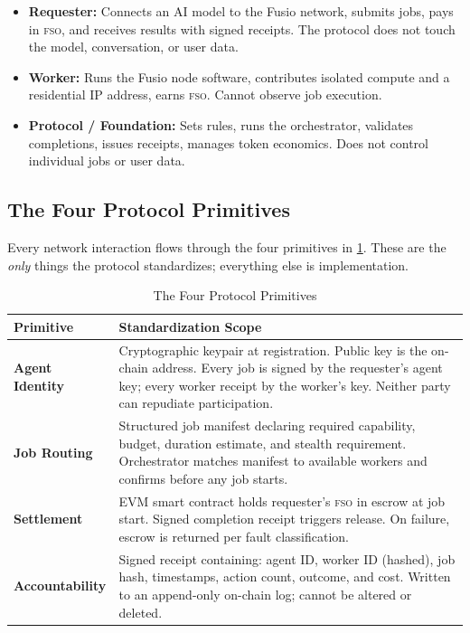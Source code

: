 \documentclass[10pt,twocolumn]{article}
\newcommand{\fso}{\textsc{fso}}
\begin{document}
\begin{itemize}[noitemsep,leftmargin=*,topsep=2pt]
  \item \textbf{Requester:} Connects an AI model to the Fusio network, submits jobs, pays in \fso{}, and receives results with signed receipts. The protocol does not touch the model, conversation, or user data.
  \item \textbf{Worker:} Runs the Fusio node software, contributes isolated compute and a residential IP address, earns \fso{}. Cannot observe job execution.
  \item \textbf{Protocol / Foundation:} Sets rules, runs the orchestrator, validates completions, issues receipts, manages token economics. Does not control individual jobs or user data.
\end{itemize}

\subsection{The Four Protocol Primitives}

Every network interaction flows through the four primitives in \cref{tab:primitives}. These are the \emph{only} things the protocol standardizes; everything else is implementation.

\begin{table}[H]
\centering
\caption{The Four Protocol Primitives}
\label{tab:primitives}
\renewcommand{\arraystretch}{1.35}
\begin{tabularx}{\columnwidth}{>{\bfseries\small}p{1.7cm} X}
\toprule
Primitive & Standardization Scope \\
\midrule
Agent Identity &
  Cryptographic keypair at registration. Public key is the on-chain address. Every job is signed by the requester's agent key; every worker receipt by the worker's key. Neither party can repudiate participation. \\[3pt]
Job Routing &
  Structured job manifest declaring required capability, budget, duration estimate, and stealth requirement. Orchestrator matches manifest to available workers and confirms before any job starts. \\[3pt]
Settlement &
  EVM smart contract holds requester's \fso{} in escrow at job start. Signed completion receipt triggers release. On failure, escrow is returned per fault classification. \\[3pt]
Accountability &
  Signed receipt containing: agent ID, worker ID (hashed), job hash, timestamps, action count, outcome, and cost. Written to an append-only on-chain log; cannot be altered or deleted. \\
\bottomrule
\end{tabularx}
\end{table}
\end{document}
